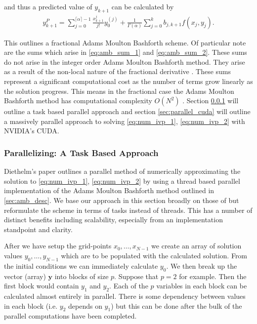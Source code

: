 and thus a predicted value of $ y_{k+1} $ can be calculated by
\begin{align}
    \label{eq:amb_y_pred}
    y_{k+1}^P = \sum_{j=0}^{\lceil \alpha \rceil - 1} \frac{x^{j}_{k+1}}{j!} y_{0}^{(j)} + \frac{1}{\Gamma(\alpha)} \sum_{j=0}^{k} b_{j,k+1} f(x_j, y_j).
\end{align}

This outlines a fractional Adams Moulton Bashforth scheme. Of particular note are the sums which arise in \eqref{eq:amb_sum_1} and \eqref{eq:amb_sum_2}. These sums do not arise in the integer order Adams Moulton Bashforth method. They arise as a result of the non-local nature of the fractional derivative \cite{Diethelm2004}. These sums represent a significant computational cost as the number of terms grow linearly as the solution progress. This means in the fractional case the Adams Moulton Bashforth method has computational complexity $ O(N^2) $ \cite{Diethelm2011}. Section \ref{sec:parallel_c} will outline a task based parallel approach and section \ref{sec:parallel_cuda} will outline a massively parallel approach to solving \eqref{eq:num_ivp_1}, \eqref{eq:num_ivp_2} with NVIDIA's CUDA.
\subsubsection{Parallelizing: A Task Based Approach}
\label{sec:parallel_c}

Diethelm's paper \cite{Diethelm2011} outlines a parallel method of numerically approximating the solution to \eqref{eq:num_ivp_1}, \eqref{eq:num_ivp_2} by using a thread based parallel implementation of the Adams Moulton Bashforth method outlined in \ref{sec:amb_desc}. We base our approach in this section broadly on those of \cite{Diethelm2011} but reformulate the scheme in terms of tasks instead of threads. This has a number of distinct benefits including scalability, especially from an implementation standpoint and clarity.

After we have setup the grid-points $ x_0, \ldots, x_{N-1} $ we create an array of solution values $ y_0, \ldots, y_{N-1} $ which are to be populated with the calculated solution. From the initial conditions we can immediately calculate $ y_0 $. We then break up the vector (array) $ \mathbf{y} $ into blocks of size $ p $. Suppose that $ p = 2 $ for example. Then the first block would contain $ y_1 $ and $ y_2 $. Each of the $ p $ variables in each block can be calculated almost entirely in parallel. There is some dependency between values in each block (i.e. $ y_2 $ depends on $ y_1 $) but this can be done after the bulk of the parallel computations have been completed.

